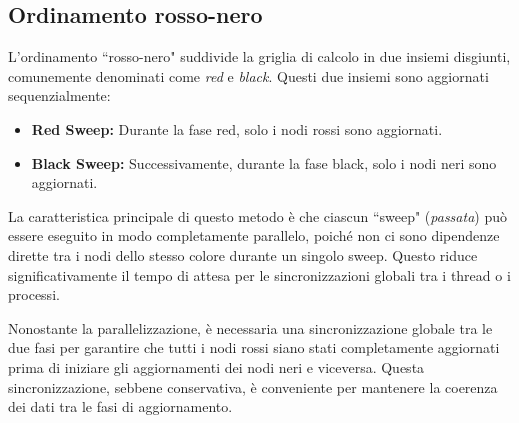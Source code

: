\subsection{Ordinamento rosso-nero}

L'ordinamento ``rosso-nero" suddivide la griglia di calcolo in due
insiemi disgiunti, comunemente denominati come
\textit{red} e \textit{black}. Questi due insiemi sono aggiornati sequenzialmente:
\begin{itemize}
  \item \textbf{Red Sweep:} Durante la fase red, solo i nodi rossi sono aggiornati.
  \item \textbf{Black Sweep:} Successivamente, durante la fase black, solo i nodi neri sono aggiornati.
\end{itemize}
La caratteristica principale di questo metodo è che ciascun ``sweep"
(\textit{passata}) può essere eseguito in modo completamente parallelo,
poiché non ci sono dipendenze dirette tra i nodi dello stesso colore
durante un singolo sweep. Questo riduce significativamente il tempo
di attesa per le sincronizzazioni globali tra i thread o i processi.


Nonostante la parallelizzazione, è necessaria una sincronizzazione globale
tra le due fasi per garantire che tutti i nodi rossi siano stati completamente
aggiornati prima di iniziare gli aggiornamenti dei nodi neri e viceversa.
Questa sincronizzazione, sebbene conservativa, è conveniente per mantenere
la coerenza dei dati tra le fasi di aggiornamento.
\begin{figure}[H]
    \centering
\end{figure}

